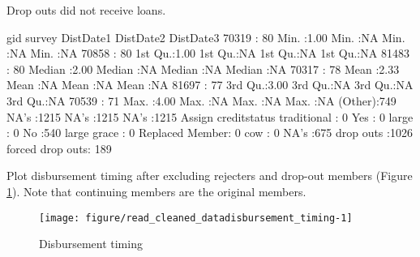 Drop outs did not receive loans.
\begin{Schunk}
\begin{Soutput}
      gid          survey       DistDate1      DistDate2      DistDate3   
 70319  : 80   Min.   :1.00   Min.   :NA     Min.   :NA     Min.   :NA    
 70858  : 80   1st Qu.:1.00   1st Qu.:NA     1st Qu.:NA     1st Qu.:NA    
 81483  : 80   Median :2.00   Median :NA     Median :NA     Median :NA    
 70317  : 78   Mean   :2.33   Mean   :NA     Mean   :NA     Mean   :NA    
 81697  : 77   3rd Qu.:3.00   3rd Qu.:NA     3rd Qu.:NA     3rd Qu.:NA    
 70539  : 71   Max.   :4.00   Max.   :NA     Max.   :NA     Max.   :NA    
 (Other):749                  NA's   :1215   NA's   :1215   NA's   :1215  
              Assign              creditstatus
 traditional     :   0   Yes            :  0  
 large           :   0   No             :540  
 large grace     :   0   Replaced Member:  0  
 cow             :   0   NA's           :675  
 drop outs       :1026                        
 forced drop outs: 189                        
                                              
\end{Soutput}
\end{Schunk}

Plot disbursement timing after excluding rejecters and drop-out members (\textsf{\small Figure \ref{Figure disbursement timing}}). Note that continuing members are the original members. \gobblepars
\begin{Schunk}
\begin{figure}

{\centering \texttt{[image: figure/read\_cleaned\_datadisbursement\_timing-1]} 

}

\caption[Disbursement timing]{Disbursement timing}\label{Figure disbursement timing}
\end{figure}
\end{Schunk}

